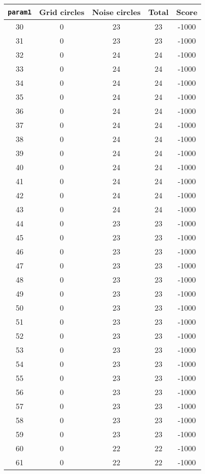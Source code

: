 \documentclass[letterpaper, 12pt]{article}
\begin{document}
\begin{longtable}{|c|c|c|c|c|}
\hline
\textbf{\texttt{param1}} & \textbf{Grid circles} & \textbf{Noise circles} & \textbf{Total} & \textbf{Score} \\
\hline
30 & 0 & 23 & 23 & -1000 \\
\hline
31 & 0 & 23 & 23 & -1000 \\
\hline
32 & 0 & 24 & 24 & -1000 \\
\hline
33 & 0 & 24 & 24 & -1000 \\
\hline
34 & 0 & 24 & 24 & -1000 \\
\hline
35 & 0 & 24 & 24 & -1000 \\
\hline
36 & 0 & 24 & 24 & -1000 \\
\hline
37 & 0 & 24 & 24 & -1000 \\
\hline
38 & 0 & 24 & 24 & -1000 \\
\hline
39 & 0 & 24 & 24 & -1000 \\
\hline
40 & 0 & 24 & 24 & -1000 \\
\hline
41 & 0 & 24 & 24 & -1000 \\
\hline
42 & 0 & 24 & 24 & -1000 \\
\hline
43 & 0 & 24 & 24 & -1000 \\
\hline
44 & 0 & 23 & 23 & -1000 \\
\hline
45 & 0 & 23 & 23 & -1000 \\
\hline
46 & 0 & 23 & 23 & -1000 \\
\hline
47 & 0 & 23 & 23 & -1000 \\
\hline
48 & 0 & 23 & 23 & -1000 \\
\hline
49 & 0 & 23 & 23 & -1000 \\
\hline
50 & 0 & 23 & 23 & -1000 \\
\hline
51 & 0 & 23 & 23 & -1000 \\
\hline
52 & 0 & 23 & 23 & -1000 \\
\hline
53 & 0 & 23 & 23 & -1000 \\
\hline
54 & 0 & 23 & 23 & -1000 \\
\hline
55 & 0 & 23 & 23 & -1000 \\
\hline
56 & 0 & 23 & 23 & -1000 \\
\hline
57 & 0 & 23 & 23 & -1000 \\
\hline
58 & 0 & 23 & 23 & -1000 \\
\hline
59 & 0 & 23 & 23 & -1000 \\
\hline
60 & 0 & 22 & 22 & -1000 \\
\hline
61 & 0 & 22 & 22 & -1000 \\

\end{longtable}
\end{document}
